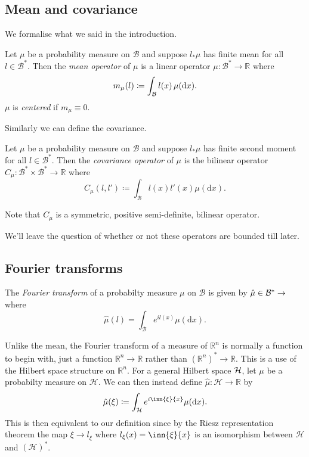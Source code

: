 \documentclass[fontsize=12pt, DIV=12]{scrreprt}
\newcommand{\defeq}{\coloneqq}
\let\C\relax
\newcommand{\R}{\mathbb R}
\newcommand{\C}{\mathbb C}
\newcommand{\calB}{\mathcal B}
\newcommand{\calH}{\mathcal H}
\newcommand{\dif}[1]{\text{d} #1}
\begin{document}
\subsection{Mean and covariance}

We formalise what we said in the introduction.

\begin{defn}
	Let $\mu$ be a probability measure on $\calB$ and suppose $l_* \mu$ has finite mean for all $l \in \calB^*$. Then the \emph{mean operator} of $\mu$ is a linear operator $\mu: \calB^* \to \R$ where
	\begin{equation}
		m_{\mu}(l) \defeq \int_{\cal B} l(x) \, \mu(\dif x).
	\end{equation}
	$\mu$ is \emph{centered} if $m_{\mu} \equiv 0$.
\end{defn}

Similarly we can define the covariance.

\begin{defn}
	Let $\mu$ be a probability measure on $\calB$ and suppose $l_* \mu$ has finite second moment for all $l \in \calB^*$. Then the \emph{covariance operator} of $\mu$ is the bilinear operator $C_{\mu} : \calB^* \times \calB^* \to \R$ where
	\begin{equation}
		C_{\mu}(l, l') \defeq \int_{\calB} l(x) l'(x) \mu(\dif x).
	\end{equation}
\end{defn}
\begin{remark}
	Note that $C_{\mu}$ is a symmetric, positive semi-definite, bilinear operator.
\end{remark}

We'll leave the question of whether or not these operators are bounded till later.

\subsection{Fourier transforms}

\begin{defn}
	The \emph{Fourier transform} of a probabilty measure $\mu$ on $\calB$ is given by $\hat{\mu} \in \calB^* \to \C$ where
	\begin{equation}
		\hat{\mu}(l) = \int_{\calB} e^{i l(x)} \mu(\dif x).
	\end{equation}
\end{defn}
\begin{remark}
	Unlike the mean, the Fourier transform of a measure of $\R^n$ is normally a function to begin with, just a function $\R^n \to \R$ rather than $(\R^n)^* \to \R$. This is a use of the Hilbert space structure on $\R^n$. For a general Hilbert space $\cal H$, let $\mu$ be a probabilty measure on $\calH$. We can then instead define $\hat{\mu}: \calH \to \R$ by
	\begin{equation}
		\hat{\mu}(\xi) \defeq \int_{\calH} e^{i \inn{\xi}{x}} \mu(\dif x).
	\end{equation}
	This is then equivalent to our definition since by the Riesz representation theorem the map $\xi \to l_{\xi}$ where $l_{\xi}(x) = \inn{\xi}{x}$ is an isomorphism between $\calH$ and $(\calH)^*$.
\end{remark}
\end{document}
